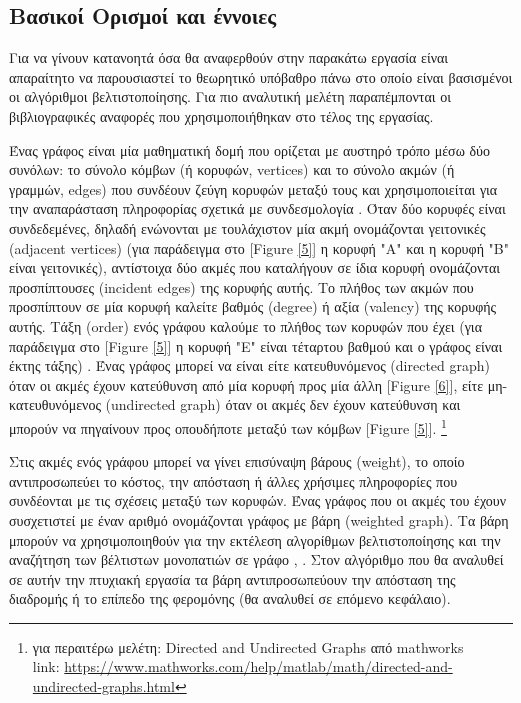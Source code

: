 \subsection{Βασικοί Ορισμοί και έννοιες}
Για να γίνουν κατανοητά όσα θα αναφερθούν στην παρακάτω εργασία είναι απαραίτητο να παρουσιαστεί το θεωρητικό υπόβαθρο πάνω στο οποίο είναι βασισμένοι οι αλγόριθμοι βελτιστοποίησης. Για πιο αναλυτική μελέτη παραπέμπονται οι βιβλιογραφικές αναφορές που χρησιμοποιήθηκαν στο τέλος της εργασίας.

Ένας γράφος είναι μία μαθηματική δομή που ορίζεται με αυστηρό τρόπο μέσω δύο συνόλων: το σύνολο κόμβων (ή κορυφών, vertices) και το σύνολο ακμών (ή γραμμών, edges) που συνδέουν ζεύγη κορυφών μεταξύ τους και χρησιμοποιείται για την αναπαράσταση πληροφορίας σχετικά με συνδεσμολογία \cite{ntenisiwtis2023thewria}. Όταν δύο κορυφές είναι συνδεδεμένες, δηλαδή ενώνονται με τουλάχιστον μία ακμή ονομάζονται γειτονικές (adjacent vertices) (για παράδειγμα στο [Figure \ref{5}] η κορυφή "Α" και η κορυφή "Β" είναι γειτονικές), αντίστοιχα δύο ακμές που καταλήγουν σε ίδια κορυφή ονομάζονται προσπίπτουσες (incident edges) της κορυφής αυτής. Το πλήθος των ακμών που προσπίπτουν σε μία κορυφή καλείτε βαθμός (degree) ή αξία (valency) της κορυφής αυτής. Τάξη (order) ενός γράφου καλούμε το πλήθος των κορυφών που έχει (για παράδειγμα στο [Figure \ref{5}] η κορυφή "Ε" είναι τέταρτου βαθμού και ο γράφος είναι έκτης τάξης) . Ένας γράφος μπορεί να είναι είτε κατευθυνόμενος (directed graph) όταν οι ακμές έχουν κατεύθυνση από μία κορυφή προς μία άλλη [Figure \ref{6}], είτε μη-κατευθυνόμενος (undirected graph) όταν οι ακμές δεν έχουν κατεύθυνση και μπορούν να πηγαίνουν προς οπουδήποτε μεταξύ των κόμβων [Figure \ref{5}]. \cite{gkertsis2023thewria} \footnote{για περαιτέρω μελέτη: Directed and Undirected Graphs από mathworks\\ link: \url{https://www.mathworks.com/help/matlab/math/directed-and-undirected-graphs.html}}

Στις ακμές ενός γράφου μπορεί να γίνει επισύναψη βάρους (weight), το οποίο αντιπροσωπεύει το κόστος, την απόσταση ή άλλες χρήσιμες πληροφορίες που συνδέονται με τις σχέσεις μεταξύ των κορυφών. Ένας γράφος που οι ακμές του έχουν συσχετιστεί με έναν αριθμό ονομάζονται γράφος με βάρη (weighted graph). Τα βάρη μπορούν να χρησιμοποιηθούν για την εκτέλεση αλγορίθμων βελτιστοποίησης και την αναζήτηση των βέλτιστων μονοπατιών σε γράφο \cite{ntenisiwtis2023thewria}, \cite{gkertsis2023thewria}. Στον αλγόριθμο που θα αναλυθεί σε αυτήν την πτυχιακή εργασία τα βάρη αντιπροσωπεύουν την απόσταση της διαδρομής ή το επίπεδο της φερομόνης (θα αναλυθεί σε επόμενο κεφάλαιο).



